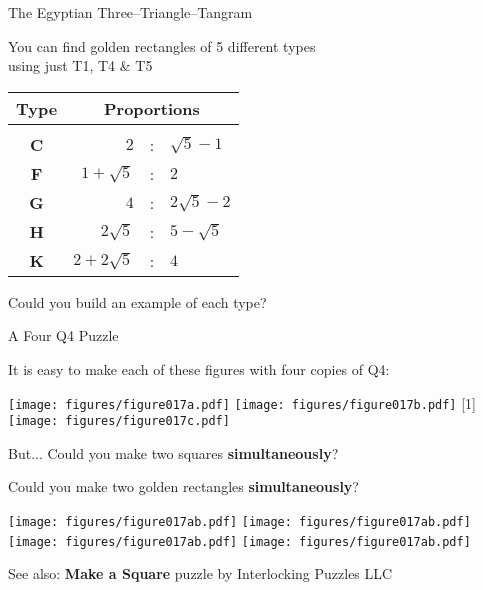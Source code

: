\documentclass[14pt]{beamer}
\begin{document}
    \begin{frame}{The Egyptian Three--Triangle--Tangram}
        \begin{center}
            You can find golden rectangles of 5 different types\\[0.5ex]using just T1, T4 \& T5

            \bigskip\bigskip

            {\small\begin{tabular}{c|rcl}
                \textbf{Type} & \multicolumn{3}{c}{\textbf{Proportions}} \\[0.5ex]\hline&&&\\[-1.5ex]
                \textbf{C} & $2$               &\!\!\!\!:\!\!\!\!& $\sqrt{5}\!-\!1$  \\
                \textbf{F} & $1\!+\!\sqrt{5}$  &\!\!\!\!:\!\!\!\!& $2$               \\
                \textbf{G} & $4$               &\!\!\!\!:\!\!\!\!& $2\sqrt{5}\!-\!2$ \\
                \textbf{H} & $2\sqrt{5}$       &\!\!\!\!:\!\!\!\!& $5\!-\!\sqrt{5}$  \\
                \textbf{K} & $2\!+\!2\sqrt{5}$ &\!\!\!\!:\!\!\!\!& $4$               \\
            \end{tabular}}

            \bigskip\bigskip

            Could you build an example of each type?
        \end{center}
    \end{frame}


    \begin{frame}{A Four Q4 Puzzle}
        \begin{center}
            {\small It is easy to make each of these figures with four copies of Q4:}

            \bigskip\medskip

            \texttt{[image: figures/figure017a.pdf]}\qquad
            \texttt{[image: figures/figure017b.pdf]}\quad\!
            \scalebox{-1}[1]{\texttt{[image: figures/figure017c.pdf]}}

            \bigskip\medskip

            {\small But... Could you make two squares \textbf{simultaneously}?\smallskip

            Could you make two golden rectangles \textbf{simultaneously}?}\bigskip\medskip

            \texttt{[image: figures/figure017ab.pdf]}\qquad
            \texttt{[image: figures/figure017ab.pdf]}\qquad
            \texttt{[image: figures/figure017ab.pdf]}\qquad
            \texttt{[image: figures/figure017ab.pdf]}\bigskip

            {\footnotesize See also: \textbf{Make a Square} puzzle by Interlocking Puzzles LLC}
        \end{center}
    \end{frame}
\end{document}
